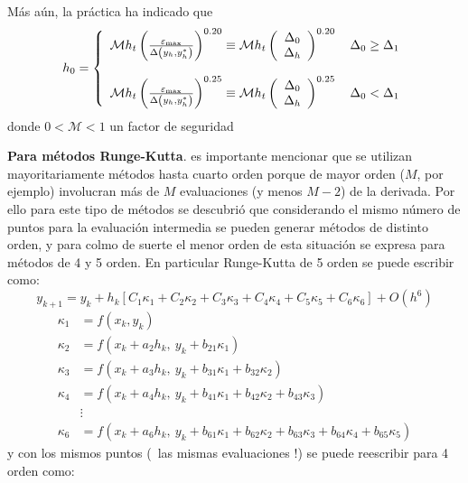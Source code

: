 \documentclass[spanish,titlepage,11pt]{article}
\begin{document}
M\'{a}s a\'{u}n, la pr\'{a}ctica ha indicado que
\[
h_{0}=\left\{
\begin{array}
[c]{c}%
\mathcal{M}h_{t}\left(  \frac{\varepsilon_{\max}}{\Delta\left(  y_{h}%
,y_{h}^{*}\right)  }\right)  ^{0.20}\equiv\mathcal{M}h_{t}\left(
\begin{array}
[c]{c}%
\Delta_{0}\\
\Delta_{h}%
\end{array}
\right)  ^{0.20}\quad\Delta_{0}\geq\Delta_{1}\\
\\
\mathcal{M}h_{t}\left(  \frac{\varepsilon_{\max}}{\Delta\left(  y_{h}%
,y_{h}^{*}\right)  }\right)  ^{0.25}\equiv\mathcal{M}h_{t}\left(
\begin{array}
[c]{c}%
\Delta_{0}\\
\Delta_{h}%
\end{array}
\right)  ^{0.25}\quad\Delta_{0}<\Delta_{1}%
\end{array}
\right.
\]
donde $0<\mathcal{M}<1$ un factor de seguridad

\textbf{Para m\'{e}todos Runge-Kutta}. es importante mencionar que se utilizan
mayoritariamente m\'{e}todos hasta cuarto orden porque de mayor orden ($M$,
por ejemplo) involucran m\'{a}s de $M$ evaluaciones (y menos $M-2$) de la
derivada. Por ello para este tipo de m\'{e}todos se descubri\'{o} que
considerando el mismo n\'{u}mero de puntos para la evaluaci\'{o}n intermedia
se pueden generar m\'{e}todos de distinto orden, y para colmo de suerte el
menor orden de esta situaci\'{o}n se expresa para m\'{e}todos de 4 y 5 orden.
En particular Runge-Kutta de 5 orden se puede escribir como:
\[
y_{k+1}=y_{k}+h_{k}\left[  C_{1}\kappa_{1}+C_{2}\kappa_{2}+C_{3}\kappa
_{3}+C_{4}\kappa_{4}+C_{5}\kappa_{5}+C_{6}\kappa_{6}\right]  +O(h^{6})
\]%
\begin{align*}
\kappa_{1} &  =f\left(  x_{k},y_{k}\right)  \\
\kappa_{2} &  =f\left(  x_{k}+a_{2}h_{k},\ y_{k}+b_{21}\kappa_{1}\right)  \\
\kappa_{3} &  =f\left(  x_{k}+a_{3}h_{k},\ y_{k}+b_{31}\kappa_{1}+b_{32}%
\kappa_{2}\right)  \\
\kappa_{4} &  =f\left(  x_{k}+a_{4}h_{k},\ y_{k}+b_{41}\kappa_{1}+b_{42}%
\kappa_{2}+b_{43}\kappa_{3}\right)  \\
&  \vdots\\
\kappa_{6} &  =f\left(  x_{k}+a_{6}h_{k},\ y_{k}+b_{61}\kappa_{1}+b_{62}%
\kappa_{2}+b_{63}\kappa_{3}+b_{64}\kappa_{4}+b_{65}\kappa_{5}\right)
\end{align*}
y con los mismos puntos (\textexclamdown \ las mismas evaluaciones !) se puede
reescribir para 4 orden como:%
\end{document}
